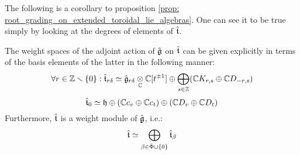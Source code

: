         The following is a corollary to proposition \ref{prop: root_grading_on_extended_toroidal_lie_algebras}. One can see it to be true simply by looking at the degrees of elements of $\hat{\mathfrak{t}}$. 
        \begin{theorem} \label{theorem: root_grading_for_extended_toroidal_lie_algebras}
            The weight spaces of the adjoint action of $\hat{\mathfrak{g}}$ on $\hat{\mathfrak{t}}$ can be given explicitly in terms of the basis elements of the latter in the following manner:
                $$
                    \forall r \in \Z \setminus \{0\}: \extendedtoroidal_{r\delta} \cong \hat{\g}_{r\delta} \tensor_{\bbC} \bbC[t^{\pm 1}] \oplus \bigoplus_{s \in \Z} ( \bbC K_{r, s} \oplus \bbC D_{-r, s} )
                $$
                $$\hat{\mathfrak{t}}_0 \simeq \mathfrak{h} \oplus (\mathbb{C} c_v \oplus \mathbb{C} c_t) \oplus (\mathbb{C} D_v \oplus \mathbb{C} D_t)$$
            Furthermore, $\hat{\mathfrak{t}}$ is a weight module of $\hat{\mathfrak{g}}$, i.e.:
                $$\hat{\mathfrak{t}} \simeq \bigoplus_{\beta \in \hat{\Phi} \cup \{0\}} \hat{\mathfrak{t}}_{\beta}$$
        \end{theorem}
